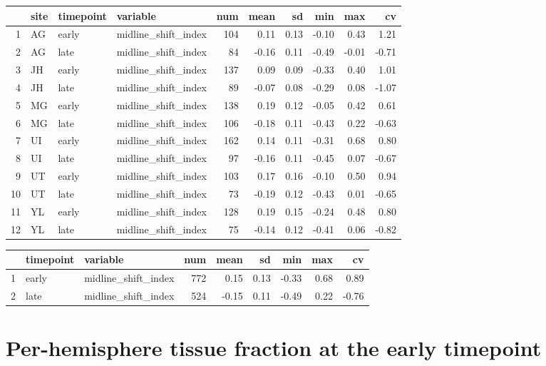 \documentclass[
]{article}
\begin{document}
\begin{table}[ht]
\centering
\begin{tabular}{rlllrrrrrr}
  \hline
 & site & timepoint & variable & num & mean & sd & min & max & cv \\ 
  \hline
1 & AG & early & midline\_shift\_index & 104 & 0.11 & 0.13 & -0.10 & 0.43 & 1.21 \\ 
  2 & AG & late & midline\_shift\_index &  84 & -0.16 & 0.11 & -0.49 & -0.01 & -0.71 \\ 
  3 & JH & early & midline\_shift\_index & 137 & 0.09 & 0.09 & -0.33 & 0.40 & 1.01 \\ 
  4 & JH & late & midline\_shift\_index &  89 & -0.07 & 0.08 & -0.29 & 0.08 & -1.07 \\ 
  5 & MG & early & midline\_shift\_index & 138 & 0.19 & 0.12 & -0.05 & 0.42 & 0.61 \\ 
  6 & MG & late & midline\_shift\_index & 106 & -0.18 & 0.11 & -0.43 & 0.22 & -0.63 \\ 
  7 & UI & early & midline\_shift\_index & 162 & 0.14 & 0.11 & -0.31 & 0.68 & 0.80 \\ 
  8 & UI & late & midline\_shift\_index &  97 & -0.16 & 0.11 & -0.45 & 0.07 & -0.67 \\ 
  9 & UT & early & midline\_shift\_index & 103 & 0.17 & 0.16 & -0.10 & 0.50 & 0.94 \\ 
  10 & UT & late & midline\_shift\_index &  73 & -0.19 & 0.12 & -0.43 & 0.01 & -0.65 \\ 
  11 & YL & early & midline\_shift\_index & 128 & 0.19 & 0.15 & -0.24 & 0.48 & 0.80 \\ 
  12 & YL & late & midline\_shift\_index &  75 & -0.14 & 0.12 & -0.41 & 0.06 & -0.82 \\ 
   \hline
\end{tabular}
\end{table}
\begin{table}[ht]
\centering
\begin{tabular}{rllrrrrrr}
  \hline
 & timepoint & variable & num & mean & sd & min & max & cv \\ 
  \hline
1 & early & midline\_shift\_index & 772 & 0.15 & 0.13 & -0.33 & 0.68 & 0.89 \\ 
  2 & late & midline\_shift\_index & 524 & -0.15 & 0.11 & -0.49 & 0.22 & -0.76 \\ 
   \hline
\end{tabular}
\end{table}

\hypertarget{per-hemisphere-tissue-fraction-at-the-early-timepoint}{%
\section{Per-hemisphere tissue fraction at the early
timepoint}\label{per-hemisphere-tissue-fraction-at-the-early-timepoint}}
\end{document}
